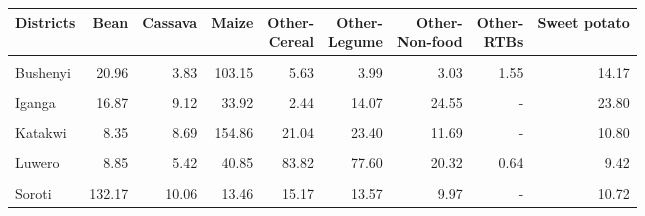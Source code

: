 \begin{table}[!h]
\centering\begingroup\fontsize{7}{9}\selectfont

\begin{tabular}{>{\raggedright\arraybackslash}p{1.8cm}rrrrrrrr}
\toprule
Districts & Bean & Cassava & Maize & \makecell{Other-\\Cereal} & \makecell{Other-\\Legume} & \makecell{Other-\\Non-food} & \makecell{Other-\\RTBs} & Sweet potato\\
\midrule
\cellcolor{gray!10}{Apac} & \cellcolor{gray!10}{35.58} & \cellcolor{gray!10}{19.10} & \cellcolor{gray!10}{37.75} & \cellcolor{gray!10}{10.90} & \cellcolor{gray!10}{63.61} & \cellcolor{gray!10}{35.85} & \cellcolor{gray!10}{0.14} & \cellcolor{gray!10}{6.48}\\
Bushenyi & 20.96 & 3.83 & 103.15 & 5.63 & 3.99 & 3.03 & 1.55 & 14.17\\
\cellcolor{gray!10}{Gulu} & \cellcolor{gray!10}{26.64} & \cellcolor{gray!10}{7.69} & \cellcolor{gray!10}{9.77} & \cellcolor{gray!10}{16.48} & \cellcolor{gray!10}{31.01} & \cellcolor{gray!10}{31.73} & \cellcolor{gray!10}{0.01} & \cellcolor{gray!10}{6.84}\\
Iganga & 16.87 & 9.12 & 33.92 & 2.44 & 14.07 & 24.55 & - & 23.80\\
\cellcolor{gray!10}{Kamuli} & \cellcolor{gray!10}{31.03} & \cellcolor{gray!10}{15.13} & \cellcolor{gray!10}{42.46} & \cellcolor{gray!10}{5.51} & \cellcolor{gray!10}{10.28} & \cellcolor{gray!10}{24.15} & \cellcolor{gray!10}{0.01} & \cellcolor{gray!10}{33.02}\\
\addlinespace
Katakwi & 8.35 & 8.69 & 154.86 & 21.04 & 23.40 & 11.69 & - & 10.80\\
\cellcolor{gray!10}{Lira} & \cellcolor{gray!10}{25.88} & \cellcolor{gray!10}{11.97} & \cellcolor{gray!10}{27.96} & \cellcolor{gray!10}{28.65} & \cellcolor{gray!10}{74.52} & \cellcolor{gray!10}{41.15} & \cellcolor{gray!10}{0.06} & \cellcolor{gray!10}{7.30}\\
Luwero & 8.85 & 5.42 & 40.85 & 83.82 & 77.60 & 20.32 & 0.64 & 9.42\\
\cellcolor{gray!10}{Mbarara} & \cellcolor{gray!10}{33.37} & \cellcolor{gray!10}{130.09} & \cellcolor{gray!10}{56.56} & \cellcolor{gray!10}{12.10} & \cellcolor{gray!10}{10.20} & \cellcolor{gray!10}{7.55} & \cellcolor{gray!10}{26.52} & \cellcolor{gray!10}{82.78}\\
Soroti & 132.17 & 10.06 & 13.46 & 15.17 & 13.57 & 9.97 & - & 10.72\\
\bottomrule
\end{tabular}
\endgroup{}
\end{table}
